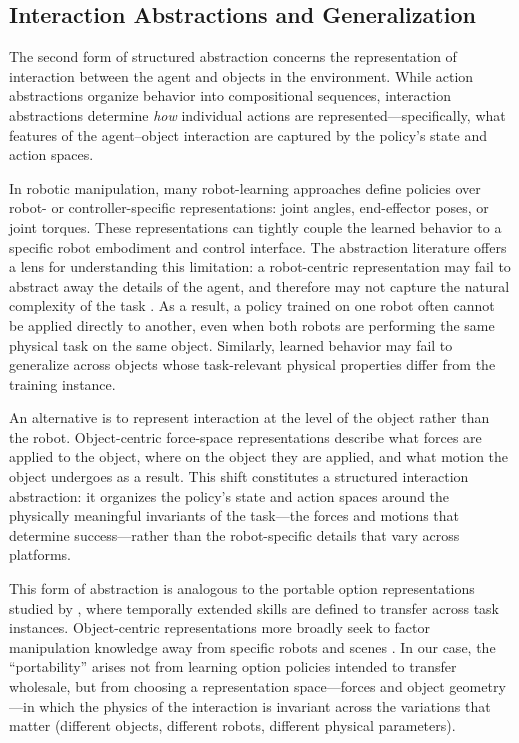 \subsection{Interaction Abstractions and Generalization}
\label{sec:interaction_abstractions}

The second form of structured abstraction concerns the representation of interaction between the agent and objects in the environment. While action abstractions organize behavior into compositional sequences, interaction abstractions determine \emph{how} individual actions are represented---specifically, what features of the agent--object interaction are captured by the policy's state and action spaces.

In robotic manipulation, many robot-learning approaches define policies over robot- or controller-specific representations: joint angles, end-effector poses, or joint torques. These representations can tightly couple the learned behavior to a specific robot embodiment and control interface. The abstraction literature offers a lens for understanding this limitation: a robot-centric representation may fail to abstract away the details of the agent, and therefore may not capture the natural complexity of the task \citep{konidaris2019necessity}. As a result, a policy trained on one robot often cannot be applied directly to another, even when both robots are performing the same physical task on the same object. Similarly, learned behavior may fail to generalize across objects whose task-relevant physical properties differ from the training instance.

An alternative is to represent interaction at the level of the object rather than the robot. Object-centric force-space representations describe what forces are applied to the object, where on the object they are applied, and what motion the object undergoes as a result. This shift constitutes a structured interaction abstraction: it organizes the policy's state and action spaces around the physically meaningful invariants of the task---the forces and motions that determine success---rather than the robot-specific details that vary across platforms.

This form of abstraction is analogous to the portable option representations studied by \citet{konidaris2007building}, where temporally extended skills are defined to transfer across task instances. Object-centric representations more broadly seek to factor manipulation knowledge away from specific robots and scenes \citep{kroemer2021review,james2022autonomous}. In our case, the ``portability'' arises not from learning option policies intended to transfer wholesale, but from choosing a representation space---forces and object geometry---in which the physics of the interaction is invariant across the variations that matter (different objects, different robots, different physical parameters).

